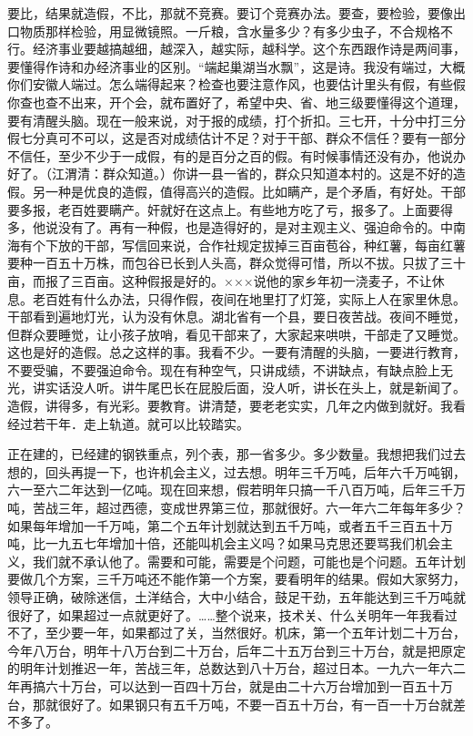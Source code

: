 要比，结果就造假，不比，那就不竞赛。要订个竞赛办法。要查，要检验，要像出口物质那样检验，用显微镜照。一斤粮，含水量多少？有多少虫子，不合规格不行。经济事业要越搞越细，越深入，越实际，越科学。这个东西跟作诗是两间事，要懂得作诗和办经济事业的区别。“端起巢湖当水飘”，这是诗。我没有端过，大概你们安徽人端过。怎么端得起来？检查也要注意作风，也要估计里头有假，有些假你查也查不出来，开个会，就布置好了，希望中央、省、地三级要懂得这个道理，要有清醒头脑。现在一般来说，对于报的成绩，打个折扣。三七开，十分中打三分假七分真可不可以，这是否对成绩估计不足？对于干部、群众不信任？要有一部分不信任，至少不少于一成假，有的是百分之百的假。有时候事情还没有办，他说办好了。（江渭清：群众知道。）你讲一县一省的，群众只知道本村的。这是不好的造假。另一种是优良的造假，值得高兴的造假。比如瞒产，是个矛盾，有好处。干部要多报，老百姓要瞒产。奸就好在这点上。有些地方吃了亏，报多了。上面要得多，他说没有了。再有一种假，也是造得好的，是对主观主义、强迫命令的。中南海有个下放的干部，写信回来说，合作社规定拔掉三百亩苞谷，种红薯，每亩红薯要种一百五十万株，而包谷已长到人头高，群众觉得可惜，所以不拔。只拔了三十亩，而报了三百亩。这种假报是好的。×××说他的家乡年初一浇麦子，不让休息。老百姓有什么办法，只得作假，夜间在地里打了灯笼，实际上人在家里休息。干部看到遍地灯光，认为没有休息。湖北省有一个县，要日夜苦战。夜间不睡觉，但群众要睡觉，让小孩子放哨，看见干部来了，大家起来哄哄，干部走了又睡觉。这也是好的造假。总之这样的事。我看不少。一要有清醒的头脑，一要进行教育，不要受骗，不要强迫命令。现在有种空气，只讲成绩，不讲缺点，有缺点脸上无光，讲实话没人听。讲牛尾巴长在屁股后面，没人听，讲长在头上，就是新闻了。造假，讲得多，有光彩。要教育。讲清楚，要老老实实，几年之内做到就好。我看经过若干年．走上轨道。就可以比较踏实。

正在建的，已经建的钢铁重点，列个表，那一省多少。多少数量。我想把我们过去想的，回头再提一下，也许机会主义，过去想。明年三千万吨，后年六千万吨钢，六一至六二年达到一亿吨。现在回来想，假若明年只搞一千八百万吨，后年三千万吨，苦战三年，超过西德，变成世界第三位，那就很好。六一年六二年每年多少？如果每年增加一千万吨，第二个五年计划就达到五千万吨，或者五千三百五十万吨，比一九五七年增加十倍，还能叫机会主义吗？如果马克思还要骂我们机会主义，我们就不承认他了。需要和可能，需要是个问题，可能也是个问题。五年计划要做几个方案，三千万吨还不能作第一个方案，要看明年的结果。假如大家努力，领导正确，破除迷信，土洋结合，大中小结合，鼓足干劲，五年能达到三千万吨就很好了，如果超过一点就更好了。……整个说来，技术关、什么关明年一年我看过不了，至少要一年，如果都过了关，当然很好。机床，第一个五年计划二十万台，今年八万台，明年十八万台到二十万台，后年二十五万台到三十万台，就是把原定的明年计划推迟一年，苦战三年，总数达到八十万台，超过日本。一九六一年六二年再搞六十万台，可以达到一百四十万台，就是由二十六万台增加到一百五十万台，那就很好了。如果钢只有五千万吨，不要一百五十万台，有一百一十万台就差不多了。


